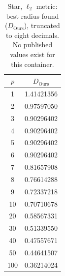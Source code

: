\begin{table}[h!]
  \centering
  \caption{Star, $\ell_2$ metric: best radius found ($D_{\mathrm{Ours}}$), truncated to eight decimals. No published values exist for this container.}
  \label{tab:pointy_star_euclidean}
  \begin{tabular}{cc}
    \hline
    $p$ & $D_{\mathrm{Ours}}$ \\
    \hline
    1 & 1.41421356 \\
    2 & 0.97597050 \\
    3 & 0.90296402 \\
    4 & 0.90296402 \\
    5 & 0.90296402 \\
    6 & 0.90296402 \\
    7 & 0.81657908 \\
    8 & 0.76614288 \\
    9 & 0.72337218 \\
    10 & 0.70710678 \\
    20 & 0.58567331 \\
    30 & 0.51339550 \\
    40 & 0.47557671 \\
    50 & 0.44641507 \\
    100 & 0.36214024 \\
    \hline
  \end{tabular}
\end{table}
